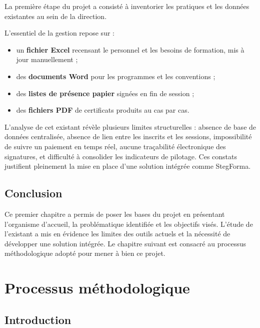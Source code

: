 \documentclass[12pt,a4paper]{report}
\begin{document}
La première étape du projet a consisté à inventorier les pratiques et les données existantes au sein de la direction.

L'essentiel de la gestion repose sur :
\begin{itemize}
    \item un \textbf{fichier Excel} recensant le personnel et les besoins de formation, mis à jour manuellement ;
    \item des \textbf{documents Word} pour les programmes et les conventions ;
    \item des \textbf{listes de présence papier} signées en fin de session ;
    \item des \textbf{fichiers PDF} de certificats produits au cas par cas.
\end{itemize}

L'analyse de cet existant révèle plusieurs limites structurelles : absence de base de données centralisée, absence de lien entre les inscrits et les sessions, impossibilité de suivre un paiement en temps réel, aucune traçabilité électronique des signatures, et difficulté à consolider les indicateurs de pilotage. Ces constats justifient pleinement la mise en place d'une solution intégrée comme StegForma.

\section*{Conclusion}
\hrulefill

Ce premier chapitre a permis de poser les bases du projet en présentant l'organisme d'accueil, la problématique identifiée et les objectifs visés. L'étude de l'existant a mis en évidence les limites des outils actuels et la nécessité de développer une solution intégrée. Le chapitre suivant est consacré au processus méthodologique adopté pour mener à bien ce projet.

\chapter{Processus méthodologique}

\section*{Introduction}
\end{document}
